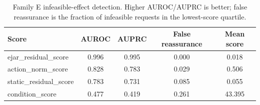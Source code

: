 \begin{table}[t]
\centering
\small
\caption{Family E infeasible-effect detection. Higher AUROC/AUPRC is better; false reassurance is the fraction of infeasible requests in the lowest-score quartile.}
\label{tab:residual-calibration}
\begin{tabular}{lcccc}
\toprule
Score & AUROC & AUPRC & False reassurance & Mean score \\
\midrule
ejar\_residual\_score & 0.996 & 0.995 & 0.000 & 0.018 \\
action\_norm\_score & 0.828 & 0.783 & 0.029 & 0.506 \\
static\_residual\_score & 0.783 & 0.731 & 0.085 & 0.055 \\
condition\_score & 0.477 & 0.419 & 0.261 & 43.395 \\
\bottomrule
\end{tabular}
\end{table}
